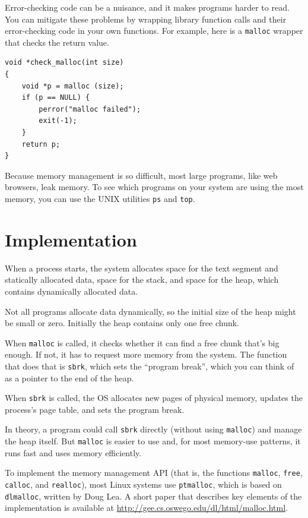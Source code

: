 \documentclass[12pt]{book}
\begin{document}
{Error-checking code can be a nuisance, and it makes programs
harder to read.  You can mitigate these problems by wrapping library
function calls and their error-checking code in your own
functions.  For example, here is a {\tt malloc} wrapper that checks
the return value.

\begin{verbatim}
void *check_malloc(int size)
{
    void *p = malloc (size);
    if (p == NULL) {
        perror("malloc failed");
        exit(-1);
    }
    return p;
}
\end{verbatim}

Because memory management is so difficult, most large programs, like
web browsers, leak memory.  To see which programs on your system are
using the most memory, you can use the UNIX utilities {\tt ps} and
{\tt top}.




\section{Implementation}

When a process starts, the system allocates space for the text segment
and statically allocated data, space for the stack, and space for the
heap, which contains dynamically allocated data.

Not all programs allocate data dynamically, so the initial size of the
heap might be small or zero.  Initially the heap contains only one
free chunk.

When {\tt malloc} is called, it checks whether it can find a free
chunk that's big enough.  If not, it has to request more memory
from the system.  The function that does that is {\tt sbrk},
which sets the ``program break'', which you can think of as a pointer
to the end of the heap.

When {\tt sbrk} is called, the OS allocates new pages of physical
memory, updates the process's page table, and sets the program
break.

In theory, a program could call {\tt sbrk} directly (without using
{\tt malloc}) and manage the heap itself.  But {\tt malloc} is easier
to use and, for most memory-use patterns, it runs fast and uses memory
efficiently.

To implement the memory management API (that is, the functions
{\tt malloc}, {\tt free}, {\tt calloc}, and {\tt realloc}),
most Linux systems use {\tt ptmalloc},
which is based on {\tt dlmalloc}, written by Doug Lea.  A short paper
that describes key elements of the implementation is
available at \url{http://gee.cs.oswego.edu/dl/html/malloc.html}.

}
\end{document}

